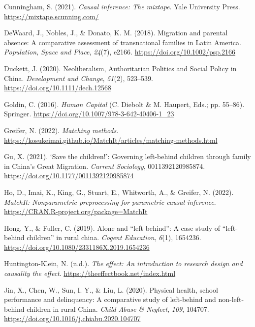 \documentclass[
  man,floatsintext]{apa7}
\newlength{\cslhangindent}
\newlength{\cslentryspacingunit} %
\newenvironment{CSLReferences}[2] %
 {%
  \setlength{\parindent}{0pt}
  \ifodd #1
  \let\oldpar\par
  \def\par{\hangindent=\cslhangindent\oldpar}
  \fi
  \setlength{\parskip}{#2\cslentryspacingunit}
 }%
 {}
\begin{document}
\begin{CSLReferences}{1}{0}
\leavevmode{}%
Cunningham, S. (2021). \emph{Causal inference: The mixtape}. Yale University Press. \url{https://mixtape.scunning.com/}

\leavevmode{}%
DeWaard, J., Nobles, J., \& Donato, K. M. (2018). Migration and parental absence: A comparative assessment of transnational families in Latin America. \emph{Population, Space and Place}, \emph{24}(7), e2166. \url{https://doi.org/10.1002/psp.2166}

\leavevmode{}%
Duckett, J. (2020). Neoliberalism, Authoritarian Politics and Social Policy in China. \emph{Development and Change}, \emph{51}(2), 523--539. \url{https://doi.org/10.1111/dech.12568}

\leavevmode{}%
Goldin, C. (2016). \emph{Human Capital} (C. Diebolt \& M. Haupert, Eds.; pp. 55--86). Springer. \url{https://doi.org/10.1007/978-3-642-40406-1_23}

\leavevmode{}%
Greifer, N. (2022). \emph{Matching methods}. \url{https://kosukeimai.github.io/MatchIt/articles/matching-methods.html}

\leavevmode{}%
Gu, X. (2021). {`}Save the children!{'}: Governing left-behind children through family in China{'}s Great Migration. \emph{Current Sociology}, 0011392120985874. \url{https://doi.org/10.1177/0011392120985874}

\leavevmode{}%
Ho, D., Imai, K., King, G., Stuart, E., Whitworth, A., \& Greifer, N. (2022). \emph{MatchIt: Nonparametric preprocessing for parametric causal inference}. \url{https://CRAN.R-project.org/package=MatchIt}

\leavevmode{}%
Hong, Y., \& Fuller, C. (2019). Alone and {``}left behind{''}: A case study of {``}left-behind children{''} in rural china. \emph{Cogent Education}, \emph{6}(1), 1654236. \url{https://doi.org/10.1080/2331186X.2019.1654236}

\leavevmode{}%
Huntington-Klein, N. (n.d.). \emph{The effect: An introduction to research design and causality \textbar{} the effect}. \url{https://theeffectbook.net/index.html}

\leavevmode{}%
Jin, X., Chen, W., Sun, I. Y., \& Liu, L. (2020). Physical health, school performance and delinquency: A comparative study of left-behind and non-left-behind children in rural China. \emph{Child Abuse \& Neglect}, \emph{109}, 104707. \url{https://doi.org/10.1016/j.chiabu.2020.104707}


\end{CSLReferences}
\end{document}
